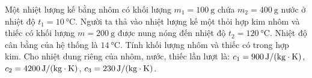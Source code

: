 \begin{ex}
	Một nhiệt lượng kế bằng nhôm có khối lượng $m_1 = \SI{100}{\gram}$ chứa $m_2 =\SI{400}{\gram}$ nước ở nhiệt độ $t_1 =\SI{10}{\celsius}$. Người ta thả vào nhiệt lượng kế một thỏi hợp kim nhôm và thiếc có khối lượng $m = \SI{200}{\gram}$ được nung nóng đến nhiệt độ $t_2 =\SI{120}{\celsius}$. Nhiệt độ cân bằng của hệ thống là $\SI{14}{\celsius}$. Tính khối lượng nhôm và thiếc có trong hợp kim. Cho nhiệt dung riêng của nhôm, nước, thiếc lần lượt là: $c_1 =\SI{900}{\joule/\left(\kilogram\cdot\kelvin\right)}$, $c_2=\SI{4200}{\joule/\left(\kilogram\cdot\kelvin\right)}$, $c_3 =\SI{230}{\joule/\left(\kilogram\cdot\kelvin\right)}$.
	
\end{ex}
